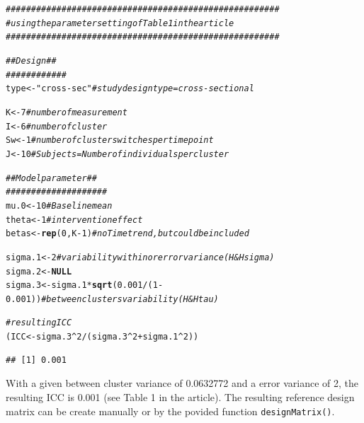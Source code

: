 \documentclass{article}\usepackage[]{graphicx}\usepackage[]{color}
\makeatletter
\newcommand{\hlnum}[1]{\textcolor[rgb]{0.686,0.059,0.569}{#1}}%
\newcommand{\hlstr}[1]{\textcolor[rgb]{0.192,0.494,0.8}{#1}}%
\newcommand{\hlcom}[1]{\textcolor[rgb]{0.678,0.584,0.686}{\textit{#1}}}%
\newcommand{\hlopt}[1]{\textcolor[rgb]{0,0,0}{#1}}%
\newcommand{\hlstd}[1]{\textcolor[rgb]{0.345,0.345,0.345}{#1}}%
\newcommand{\hlkwa}[1]{\textcolor[rgb]{0.161,0.373,0.58}{\textbf{#1}}}%
\newcommand{\hlkwb}[1]{\textcolor[rgb]{0.69,0.353,0.396}{#1}}%
\newcommand{\hlkwd}[1]{\textcolor[rgb]{0.737,0.353,0.396}{\textbf{#1}}}%
\newenvironment{kframe}{%
 \def\at@end@of@kframe{}%
 \ifinner\ifhmode%
  \def\at@end@of@kframe{\end{minipage}}%
  \begin{minipage}{\columnwidth}%
 \fi\fi%
 \def\FrameCommand##1{\hskip\@totalleftmargin \hskip-\fboxsep
 \colorbox{shadecolor}{##1}\hskip-\fboxsep
     \hskip-\linewidth \hskip-\@totalleftmargin \hskip\columnwidth}%
 \MakeFramed {\advance\hsize-\width
   \@totalleftmargin\z@ \linewidth\hsize
   \@setminipage}}%
 {\par\unskip\endMakeFramed%
 \at@end@of@kframe}
\newenvironment{knitrout}{}{} %
\newcommand{\Rfunction}[1]{{\texttt{#1}}}
\makeatother
\begin{document}
\begin{knitrout}
\color{fgcolor}\begin{kframe}
\begin{alltt}
\hlcom{######################################################}
\hlcom{#using the parameter setting of Table 1 in the article}
\hlcom{######################################################}

\hlcom{## Design ##}
\hlcom{############}
\hlstd{type}\hlkwb{<-}\hlstr{"cross-sec"} \hlcom{# study design type = cross-sectional}

\hlstd{K}\hlkwb{<-}\hlnum{7} \hlcom{#number of measurement}
\hlstd{I}\hlkwb{<-}\hlnum{6} \hlcom{#number of cluster}
\hlstd{Sw}\hlkwb{<-}\hlnum{1} \hlcom{#number of cluster switches per time point}
\hlstd{J}\hlkwb{<-}\hlnum{10} \hlcom{#Subjects =  Number of individuals per cluster}


\hlcom{## Model parameter ##}
\hlcom{####################}
\hlstd{mu.0}\hlkwb{<-} \hlnum{10}           \hlcom{# Baseline mean}
\hlstd{theta} \hlkwb{<-} \hlnum{1}          \hlcom{# intervention effect}
\hlstd{betas}\hlkwb{<-}\hlkwd{rep}\hlstd{(}\hlnum{0}\hlstd{, K}\hlopt{-}\hlnum{1}\hlstd{)}  \hlcom{# no Time trend, but could be included}

\hlstd{sigma.1}\hlkwb{<-}\hlnum{2}    \hlcom{# variability within or error variance (H&H sigma)}
\hlstd{sigma.2}\hlkwb{<-}\hlkwa{NULL}
\hlstd{sigma.3}\hlkwb{<-}\hlstd{sigma.1}\hlopt{*}\hlkwd{sqrt}\hlstd{(}\hlnum{0.001}\hlopt{/}\hlstd{(}\hlnum{1}\hlopt{-}\hlnum{0.001}\hlstd{))}    \hlcom{# between clusters variability (H&H tau)}

\hlcom{#resulting ICC}
\hlstd{(ICC}\hlkwb{<-}\hlstd{sigma.3}\hlopt{^}\hlnum{2}\hlopt{/}\hlstd{(sigma.3}\hlopt{^}\hlnum{2}\hlopt{+}\hlstd{sigma.1}\hlopt{^}\hlnum{2}\hlstd{))}
\end{alltt}
\begin{verbatim}
## [1] 0.001
\end{verbatim}
\end{kframe}
\end{knitrout}


With a given between cluster variance of 0.0632772 and a error variance of 2, the resulting ICC is 0.001 (see Table 1 in the article). The resulting reference design matrix can be create manually or by the povided function \Rfunction{designMatrix()}.
\end{document}
